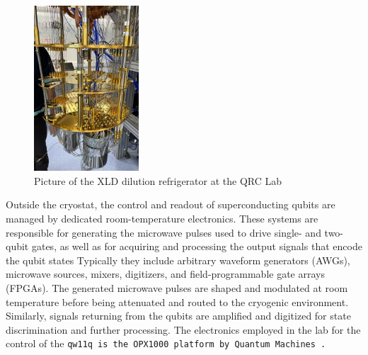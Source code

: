 \begin{figure}[h!]
    \centering
    \includegraphics[width=0.35\textwidth]{figures/png/XLD1000.png}
    \caption{Picture of the XLD dilution refrigerator at the QRC Lab}
    \label{fig:XLDsl}
\end{figure}

Outside the cryostat, the control and readout of superconducting qubits are managed by dedicated room-temperature electronics.
These systems are responsible for generating the microwave pulses used to drive single- and two-qubit gates, as well as for acquiring and processing the output signals that encode the qubit states 
Typically they include arbitrary waveform generators (AWGs), microwave sources, mixers, digitizers, and field-programmable gate arrays (FPGAs).
The generated microwave pulses are shaped and modulated at room temperature before being attenuated and routed to the cryogenic environment. 
Similarly, signals returning from the qubits are amplified and digitized for state discrimination and further processing. 
The electronics employed in the lab for the control of the \tt{qw11q} is the OPX1000 platform by Quantum Machines \cite{opx1000}.

